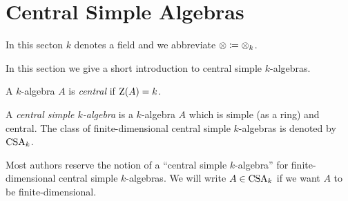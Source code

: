 \section{Central Simple Algebras}


\begin{conventions}
  In this secton $k$ denotes a field and we abbreviate $\otimes \coloneqq \otimes_k$.
\end{conventions}


\begin{fluff}
  In this section we give a short introduction to central simple $k$-algebras.
\end{fluff}


\begin{definition}
  A $k$-algebra $A$ is \emph{central} if $\operatorname{Z}(A) = k$.
\end{definition}


\begin{definition}
  A \emph{central simple $k$-algebra} is a $k$-algebra $A$ which is simple (as a ring) and central.
  The class of finite-dimensional central simple $k$-algebras is denoted by $\operatorname{CSA}_k$.
\end{definition}


\begin{remark}
  Most authors reserve the notion of a \enquote{central simple $k$-algebra} for finite-dimensional central simple $k$-algebras.
  We will write $A \in \operatorname{CSA}_k$ if we want $A$ to be finite-dimensional.
\end{remark}












